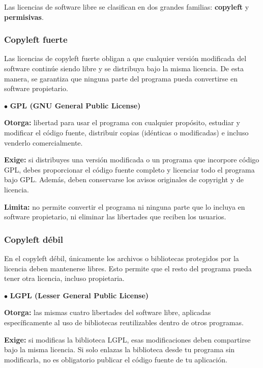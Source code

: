 \documentclass[12pt]{article}
\begin{document}
    Las licencias de software libre se clasifican en dos grandes familias: \textbf{copyleft} y \textbf{permisivas}.

    \subsubsection{Copyleft fuerte}

    Las licencias de copyleft fuerte obligan a que cualquier versión modificada del software continúe siendo libre y se distribuya bajo la misma licencia. De esta manera, se garantiza que ninguna parte del programa pueda convertirse en software propietario.

    \smallskip

    \hspace*{\parindent}$\bullet$ \textbf{GPL (GNU General Public License)}

    \textbf{Otorga:} libertad para usar el programa con cualquier propósito, estudiar y modificar el código fuente, distribuir copias (idénticas o modificadas) e incluso venderlo comercialmente.

    \textbf{Exige:} si distribuyes una versión modificada o un programa que incorpore código GPL, debes proporcionar el código fuente completo y licenciar todo el programa bajo GPL. Además, deben conservarse los avisos originales de copyright y de licencia.

    \textbf{Limita:} no permite convertir el programa ni ninguna parte que lo incluya en software propietario, ni eliminar las libertades que reciben los usuarios.

    \medskip

    \subsubsection{Copyleft débil}

    En el copyleft débil, únicamente los archivos o bibliotecas protegidos por la licencia deben mantenerse libres. Esto permite que el resto del programa pueda tener otra licencia, incluso propietaria.

    \smallskip

    \hspace*{\parindent}$\bullet$ \textbf{LGPL (Lesser General Public License)}

    \textbf{Otorga:} las mismas cuatro libertades del software libre, aplicadas específicamente al uso de bibliotecas reutilizables dentro de otros programas.

    \textbf{Exige:} si modificas la biblioteca LGPL, esas modificaciones deben compartirse bajo la misma licencia. Si solo enlazas la biblioteca desde tu programa sin modificarla, no es obligatorio publicar el código fuente de tu aplicación.
\end{document}
